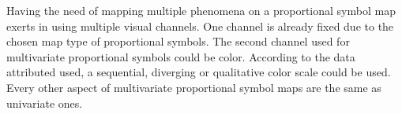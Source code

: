Having the need of mapping multiple phenomena on a proportional symbol map exerts in using multiple visual channels. One channel is already fixed due to the chosen map type of proportional symbols. The second channel used for multivariate proportional symbols could be color. According to the data attributed used, a sequential, diverging or qualitative color scale could be used. Every other aspect of multivariate proportional symbol maps are the same as univariate ones.